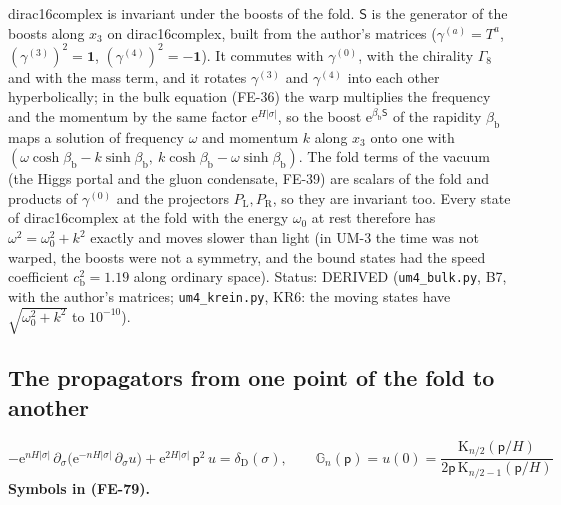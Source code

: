 \documentclass[
  10pt,
]{article}
\begin{document}
dirac16complex is invariant under the boosts of the fold. \(\mathsf{S}\)
is the generator of the boosts along \(x_3\) on dirac16complex, built
from the author's matrices (\(\gamma^{(a)} = T^a\),
\((\gamma^{(3)})^2 = \mathbf{1}\), \((\gamma^{(4)})^2 = -\mathbf{1}\)).
It commutes with \(\gamma^{(0)}\), with the chirality \(\Gamma_8\) and
with the mass term, and it rotates \(\gamma^{(3)}\) and \(\gamma^{(4)}\)
into each other hyperbolically; in the bulk equation (FE-36) the warp
multiplies the frequency and the momentum by the same factor
\(\mathrm{e}^{H\lvert\sigma\rvert}\), so the boost
\(\mathrm{e}^{\beta_{\mathrm{b}}\mathsf{S}}\) of the rapidity
\(\beta_{\mathrm{b}}\) maps a solution of frequency \(\omega\) and
momentum \(k\) along \(x_3\) onto one with
\((\omega\cosh\beta_{\mathrm{b}} - k\sinh\beta_{\mathrm{b}},\ k\cosh\beta_{\mathrm{b}} - \omega\sinh\beta_{\mathrm{b}})\).
The fold terms of the vacuum (the Higgs portal and the gluon condensate,
FE-39) are scalars of the fold and products of \(\gamma^{(0)}\) and the
projectors \(P_{\mathrm{L}}, P_{\mathrm{R}}\), so they are invariant
too. Every state of dirac16complex at the fold with the energy
\(\omega_0\) at rest therefore has \(\omega^2 = \omega_0^2 + k^2\)
exactly and moves slower than light (in UM-3 the time was not warped,
the boosts were not a symmetry, and the bound states had the speed
coefficient \(c_{\mathrm{b}}^2 = 1.19\) along ordinary space). Status:
DERIVED (\texttt{um4\_bulk.py}, B7, with the author's matrices;
\texttt{um4\_krein.py}, KR6: the moving states have
\(\sqrt{\omega_0^2 + k^2}\) to \(10^{-10}\)).

\hypertarget{the-propagators-from-one-point-of-the-fold-to-another}{%
\subsection{The propagators from one point of the fold to
another}\label{the-propagators-from-one-point-of-the-fold-to-another}}

\[
-\mathrm{e}^{nH\lvert\sigma\rvert}\,\partial_\sigma\big(\mathrm{e}^{-nH\lvert\sigma\rvert}\,\partial_\sigma u\big)
 + \mathrm{e}^{2H\lvert\sigma\rvert}\,\mathsf{p}^2\,u = \delta_{\mathrm{D}}(\sigma),\qquad
\mathbb{G}_n(\mathsf{p}) = u(0) = \frac{\mathrm{K}_{n/2}(\mathsf{p}/H)}{2\mathsf{p}\,\mathrm{K}_{n/2-1}(\mathsf{p}/H)} \tag{FE-79}
\] \textbf{Symbols in (FE-79).}
\end{document}
